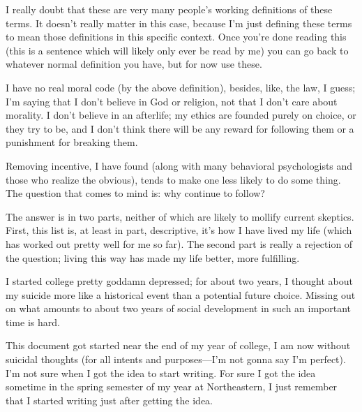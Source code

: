 \documentclass[./butidigress.tex]{subfiles}
\begin{document}
I really doubt that these are very many people's working definitions of these terms.
It doesn't really matter in this case, because I'm just defining these terms to mean those definitions in this specific context.
Once you're done reading this (this is a sentence which will likely only ever be read by me) you can go back to whatever normal definition you have, but for now use these.

I have no real moral code (by the above definition), besides, like, the law, I guess; I'm saying that I don't believe in God or religion, not that I don't care about morality.
I don't believe in an afterlife; my ethics are founded purely on choice, or they try to be, and I don't think there will be any reward for following them or a punishment for breaking them.

Removing incentive, I have found (along with many behavioral psychologists and those who realize the obvious), tends to make one less likely to do some thing.
The question that comes to mind is: why continue to follow?

The answer is in two parts, neither of which are likely to mollify current skeptics.
First, this list is, at least in part, descriptive, it's how I have lived my life (which has worked out pretty well for me so far).
The second part is really a rejection of the question; living this way has made my life better, more fulfilling.

\label{sec:development}
I started college pretty goddamn depressed; for about two years, I thought about my suicide more like a historical event than a potential future choice.
Missing out on what amounts to about two years of social development in such an important time is hard.

This document got started near the end of my  year of college, I am now without suicidal thoughts (for all intents and purposes---I'm not gonna say I'm perfect).
I'm not sure when I got the idea to start writing.
For sure I got the idea sometime in the spring semester of my  year at Northeastern, I just remember that I started writing just after getting the idea.
\end{document}

